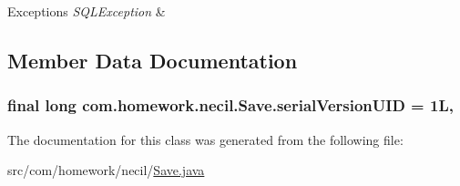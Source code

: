 \begin{DoxyExceptions}{Exceptions}
{\em S\+Q\+L\+Exception} & \\
\hline
\end{DoxyExceptions}


\subsection{Member Data Documentation}
\subsubsection[{\texorpdfstring{serial\+Version\+U\+ID}{serialVersionUID}}]{\setlength{\rightskip}{0pt plus 5cm}final long com.\+homework.\+necil.\+Save.\+serial\+Version\+U\+ID = 1L\hspace{0.3cm}{\ttfamily [static]}, {\ttfamily [private]}}\hypertarget{classcom_1_1homework_1_1necil_1_1_save_a119bae6e5d7806d885bc422930468430}{}\label{classcom_1_1homework_1_1necil_1_1_save_a119bae6e5d7806d885bc422930468430}


The documentation for this class was generated from the following file\+:\begin{DoxyCompactItemize}
\item 
src/com/homework/necil/\hyperlink{_save_8java}{Save.\+java}\end{DoxyCompactItemize}
